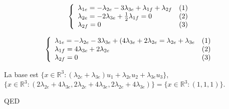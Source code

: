 \documentclass[]{book}
\theoremstyle{definition}
\newcommand{\bb}[1]{\mathbb{#1}}
\newcommand{\R}{\bb{R}}
\begin{document}
$$
\left\{ 
\begin{array}{l l}
\lambda_{1e} = -\lambda_{2e} - 3\lambda_{3e} + \lambda_{1f} + \lambda_{2f} & (1)\\
\lambda_{2e} = -2\lambda_{3e} + \frac{1}{2}\lambda_{1f} = 0 & (2)\\
\lambda_{2f} = 0 & (3)\\
\end{array}
\right. 
$$ 

$$
\left\{ 
\begin{array}{l l}
\lambda_{1e} = -\lambda_{2e} - 3\lambda_{3e} + (4\lambda_{3e} + 2\lambda_{2e} = \lambda_{2e} + \lambda_{3e} & (1)\\
\lambda_{1f} = 4\lambda_{3e} + 2\lambda_{2e} & (2)\\
\lambda_{2f} = 0 & (3)\\
\end{array}
\right. 
$$ 


La base est $\{x \in \R^3: (\lambda_{2e} + \lambda_{3e})u_1 + \lambda_{2e}u_2 + \lambda_{3e}u_3 \}$, $\{x \in \R^3: (2\lambda_{2e} + 4\lambda_{3e}, 2\lambda_{2e} + 4\lambda_{3e}, 2\lambda_{2e} + 4\lambda_{3e}) \} = \{x \in \R^3: (1,1,1) \}$.

QED
\end{document}
